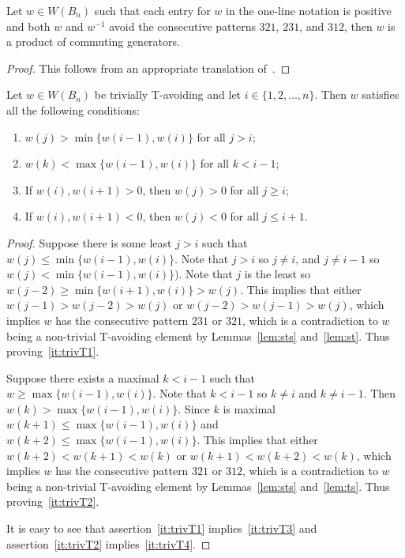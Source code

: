 \begin{lemma}\label{lem:prodofcommA}
Let $w \in W(B_n)$ such that each entry for $w$ in the one-line notation is positive and both $w$ and $w^{-1}$ avoid the consecutive patterns $321$, $231$, and $312$, then $w$ is a product of commuting generators.
\begin{proof}
	This follows from an appropriate translation of~\cite[Lemma 2.2.9]{Gern2013a}.
\end{proof}	
\end{lemma}

\begin{lemma}\label{lem:prodofCommB}
Let $w \in W(B_n)$ be trivially T-avoiding and let $i \in \{1,2, \ldots, n\}$. Then $w$ satisfies all the following conditions:
\begin{enumerate}[leftmargin=2cm]
\item $w(j) > \min\{w(i-1), w(i)\}$ for all $j >i$;\label{it:trivT1}
\item $w(k) < \max\{w(i-1), w(i)\}$ for all $k < i-1$;\label{it:trivT2}
\item If $w(i), w(i+1) > 0$, then $w(j)>0$ for all $j \geq i$;\label{it:trivT3}
\item If $w(i), w(i+1) < 0$, then $w(j)<0$ for all $j \leq i+1$.\label{it:trivT4}
\end{enumerate}
\begin{proof}
	Suppose there is some least $j>i$ such that $w(j) \leq \min\{w(i-1), w(i)\}$. Note that $j>i$ so $j \neq i$, and $j \neq i-1$ so $w(j) < \min\{w(i-1), w(i)\})$. Note that $j$ is the least so $w(j-2) \geq \min\{w(i+1), w(i)\}>w(j)$. This implies that either $w(j-1)>w(j-2)>w(j)$ or $w(j-2)>w(j-1)>w(j)$, which implies $w$ has the consecutive pattern $231$ or $321$, which is a contradiction to $w$ being a non-trivial T-avoiding element by Lemmas~\ref{lem:sts} and~\ref{lem:st}. Thus proving~\ref{it:trivT1}.
	
	Suppose there exists a maximal $k<i-1$ such that $w \geq \max\{w(i-1), w(i)\}$. Note that $k < i-1$ so $k \neq i$ and $k \neq i-1$. Then $w(k)> \max\{w(i-1), w(i)\}$. Since $k$ is maximal $w(k+1) \leq  \max\{w(i-1), w(i)\}$ and $w(k+2) \leq \max\{w(i-1), w(i)\}$. This implies that either $w(k+2)<w(k+1)<w(k)$ or $w(k+1)<w(k+2)<w(k)$, which implies $w$ has the consecutive pattern $321$ or $312$, which is a contradiction to $w$ being a non-trivial T-avoiding element by Lemmas~\ref{lem:sts} and~\ref{lem:ts}. Thus proving~\ref{it:trivT2}.
	
	It is easy to see that assertion~\ref{it:trivT1} implies~\ref{it:trivT3} and assertion~\ref{it:trivT2} implies~\ref{it:trivT4}.
\end{proof}	
\end{lemma}

